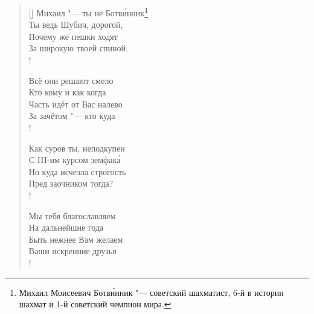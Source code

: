 \clearpage							%
\settowidth{\versewidth}{Всё они решают смело}		%
\begin{verse}[\versewidth]
Михаил "--- ты не Ботв\'{и}нник\footnote{Михаил Моисеевич Ботв\'{и}нник "--- советский шахматист, 6-й в истории шахмат и 1-й советский чемпион мира.}	\\
Ты ведь Шубич, дорогой,	\\
Почему же пешки ходят	\\
За широкую твоей спиной.	\\!

\vin Всё они решают смело	\\
\vin Кто кому и как когда	\\
\vin Часть идёт от Вас налево	\\
\vin За зачётом "--- кто куда	\\!

Как суров ты, неподкупен	\\
С III-им курсом земфак\'{а}	\\
Но куда исчезла строгость	\\
Пред заочником тогда?	\\!

\vin Мы тебя благославляем	\\
\vin На дальнейшие года	\\
\vin Быть нежнее Вам желаем	\\
\vin Ваши искренние друзья	\\!
\end{verse}
